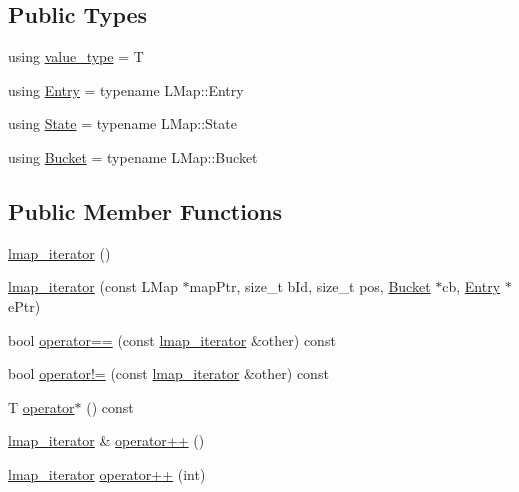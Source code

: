 \subsection*{Public Types}
\begin{DoxyCompactItemize}
\item 
using \hyperlink{classshad_1_1lmap__iterator_a5aaca46b07b8669790d0134b6f4a9f97}{value\-\_\-type} = T
\item 
using \hyperlink{classshad_1_1lmap__iterator_a67f31795cef049e504582e3ec92232ba}{Entry} = typename L\-Map\-::\-Entry
\item 
using \hyperlink{classshad_1_1lmap__iterator_a21e8efc8bee9e50f89cd3c17a0c18673}{State} = typename L\-Map\-::\-State
\item 
using \hyperlink{classshad_1_1lmap__iterator_aa37c8a6e06e10d9256e3ce2be6fabb4a}{Bucket} = typename L\-Map\-::\-Bucket
\end{DoxyCompactItemize}
\subsection*{Public Member Functions}
\begin{DoxyCompactItemize}
\item 
\hyperlink{classshad_1_1lmap__iterator_a56f6c9d476d6ad8d8693554c80c32bca}{lmap\-\_\-iterator} ()
\item 
\hyperlink{classshad_1_1lmap__iterator_a692400133c2520870cec48845f46aa5b}{lmap\-\_\-iterator} (const L\-Map $\ast$map\-Ptr, size\-\_\-t b\-Id, size\-\_\-t pos, \hyperlink{classshad_1_1lmap__iterator_aa37c8a6e06e10d9256e3ce2be6fabb4a}{Bucket} $\ast$cb, \hyperlink{classshad_1_1lmap__iterator_a67f31795cef049e504582e3ec92232ba}{Entry} $\ast$e\-Ptr)
\item 
bool \hyperlink{classshad_1_1lmap__iterator_ad07acefab2006a2836fef3e333eb615c}{operator==} (const \hyperlink{classshad_1_1lmap__iterator}{lmap\-\_\-iterator} \&other) const 
\item 
bool \hyperlink{classshad_1_1lmap__iterator_a9805a06dcd00b59d7e66184ab1deabd1}{operator!=} (const \hyperlink{classshad_1_1lmap__iterator}{lmap\-\_\-iterator} \&other) const 
\item 
T \hyperlink{classshad_1_1lmap__iterator_a0a93b6df2a3dd0a342f018bae3700d95}{operator$\ast$} () const 
\item 
\hyperlink{classshad_1_1lmap__iterator}{lmap\-\_\-iterator} \& \hyperlink{classshad_1_1lmap__iterator_a2fb20e73193dc51da1278f91724a119e}{operator++} ()
\item 
\hyperlink{classshad_1_1lmap__iterator}{lmap\-\_\-iterator} \hyperlink{classshad_1_1lmap__iterator_abba47ae81bde6f3ad2ff31327aa6f68c}{operator++} (int)
\end{DoxyCompactItemize}
